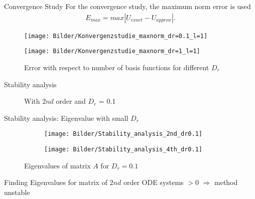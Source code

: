 \begin{frame}{Convergence Study}
	For the convergence study, the maximum norm error is used
	\begin{align*}
		E_{max} = max|U_{exact} - U_{approx}|.
	\end{align*}
	
	\begin{figure}
		\begin{minipage}{0.45\textwidth}
			\texttt{[image: Bilder/Konvergenzstudie\_maxnorm\_dr=0.1\_l=1]}
		\end{minipage}
		\hfill 
		\begin{minipage}{0.45\textwidth}
			\texttt{[image: Bilder/Konvergenzstudie\_maxnorm\_dr=1\_l=1]}
		\end{minipage}
		\caption{Error with respect to number of basis functions for different $D_r$}
	\end{figure}
\end{frame}


\begin{frame}{Stability analysis}
	\begin{figure}
		\centering
		\qquad
		\caption{With $2nd$ order and $D_r$ = 0.1}
	\end{figure}
\end{frame}

\begin{frame}{Stability analysis: Eigenvalue with small $D_r$}
	\begin{figure}
		\begin{subfigure}{0.48\textwidth}
			\texttt{[image: Bilder/Stability\_analysis\_2nd\_dr0.1]}
		\end{subfigure}
		\hfill
		\begin{subfigure}{0.48\textwidth}
			\texttt{[image: Bilder/Stability\_analysis\_4th\_dr0.1]}
		\end{subfigure}
		\caption{Eigenvalues of matrix $A$ for $D_r = 0.1$}
	\end{figure}

	\begin{block}{Finding}
		Eigenvalues for matrix of $2nd$ order ODE systems $>0$ $\Rightarrow$ method unstable
	\end{block}
\end{frame}

